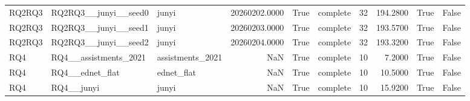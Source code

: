 \begin{tabular}{lllrrlrrrr}
RQ2RQ3 & RQ2RQ3\_\_junyi\_\_seed0 & junyi & 20260202.0000 & True & complete & 32 & 194.2800 & True & False \\
RQ2RQ3 & RQ2RQ3\_\_junyi\_\_seed1 & junyi & 20260203.0000 & True & complete & 32 & 193.5700 & True & False \\
RQ2RQ3 & RQ2RQ3\_\_junyi\_\_seed2 & junyi & 20260204.0000 & True & complete & 32 & 193.3200 & True & False \\
RQ4 & RQ4\_\_assistments\_2021 & assistments\_2021 & NaN & True & complete & 10 & 7.2000 & True & False \\
RQ4 & RQ4\_\_ednet\_flat & ednet\_flat & NaN & True & complete & 10 & 10.5000 & True & False \\
RQ4 & RQ4\_\_junyi & junyi & NaN & True & complete & 10 & 15.9200 & True & False \\
\bottomrule
\end{tabular}
